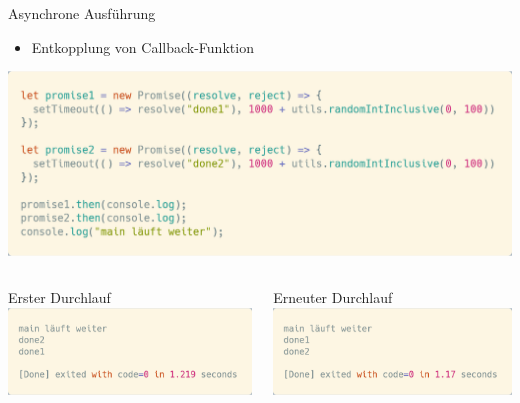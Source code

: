 \documentclass[t,handout]{beamer}
\begin{document}
\begin{frame}{Asynchrone Ausführung}
  \begin{itemize}
    \item Entkopplung von Callback-Funktion
  \end{itemize}
  \begin{center}
    \includegraphics[scale=.24]{fig/promises3.png}\\[.2cm]
    \begin{columns}
      \begin{column}{0.48\textwidth}
        Erster Durchlauf\\[.2cm]
        \includegraphics[scale=.21]{fig/promises4.png}
      \end{column}
      \begin{column}{0.48\textwidth}
        Erneuter Durchlauf\\[.2cm]
        \includegraphics[scale=.21]{fig/promises5.png}
      \end{column}
    \end{columns}
  \end{center}
\end{frame}
\end{document}
